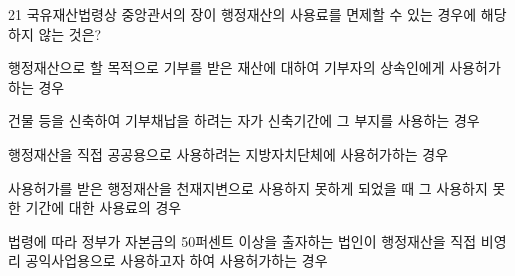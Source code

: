 \begin{question}{21}
국유재산법령상 중앙관서의 장이 행정재산의 사용료를 면제할 수 있는 경우에 해당하지 않는 것은?
\begin{choices}
  \item 행정재산으로 할 목적으로 기부를 받은 재산에 대하여 기부자의 상속인에게 사용허가하는 경우
  \item 건물 등을 신축하여 기부채납을 하려는 자가 신축기간에 그 부지를 사용하는 경우
  \item 행정재산을 직접 공공용으로 사용하려는 지방자치단체에 사용허가하는 경우
  \item 사용허가를 받은 행정재산을 천재지변으로 사용하지 못하게 되었을 때 그 사용하지 못한 기간에 대한 사용료의 경우
  \item 법령에 따라 정부가 자본금의 50퍼센트 이상을 출자하는 법인이 행정재산을 직접 비영리 공익사업용으로 사용하고자 하여 사용허가하는 경우
\end{choices}
\end{question}
